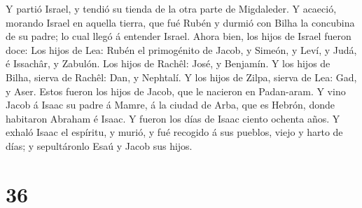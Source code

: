  Y partió Israel, y tendió su tienda de la otra parte de
Migdaleder.  Y acaeció, morando Israel en aquella tierra,
que fué Rubén y durmió con Bilha la concubina de su padre; lo cual llegó
á entender Israel. Ahora bien, los hijos de Israel fueron doce:
 Los hijos de Lea: Rubén el primogénito de Jacob, y Simeón,
y Leví, y Judá, é Issachâr, y Zabulón.  Los hijos de
Rachêl: José, y Benjamín.  Y los hijos de Bilha, sierva de
Rachêl: Dan, y Nephtalí.  Y los hijos de Zilpa, sierva de
Lea: Gad, y Aser. Estos fueron los hijos de Jacob, que le nacieron en
Padan-aram.  Y vino Jacob á Isaac su padre á Mamre, á la
ciudad de Arba, que es Hebrón, donde habitaron Abraham é Isaac.
 Y fueron los días de Isaac ciento ochenta años.
 Y exhaló Isaac el espíritu, y murió, y fué recogido á sus
pueblos, viejo y harto de días; y sepultáronlo Esaú y Jacob sus hijos.

\hypertarget{section-35}{%
\section{36}\label{section-35}}

